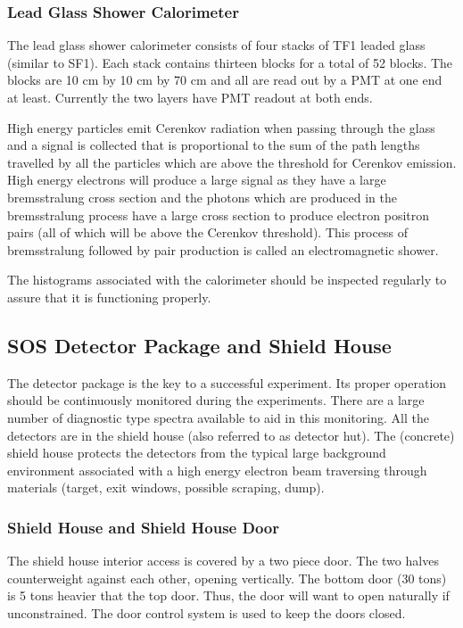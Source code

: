 \subsubsection{Lead Glass Shower Calorimeter}

The lead glass shower calorimeter consists of four stacks of
TF1 leaded glass (similar to SF1). Each stack contains thirteen
blocks for a total of 52 blocks. The blocks are 10 cm by 10 cm by 70
cm and all are read out by a PMT at one end at least.  Currently the
two layers have PMT readout at both ends.

High energy particles
emit Cerenkov radiation when passing through the glass and a signal
is collected that is proportional to the sum of the path lengths
travelled by all the
particles which are above the threshold for Cerenkov emission. High energy
electrons will produce a large signal as they have a large bremsstralung
cross section and the photons which are produced in the bremsstralung
process have a large cross section to produce electron positron pairs
(all of which will be above the Cerenkov threshold). This process
of bremsstralung followed by pair production is called an electromagnetic
shower.

The histograms associated with the calorimeter should be inspected
regularly to assure that it is functioning properly.


\subsection{SOS Detector Package and Shield House }

The detector package is the key to a successful experiment. Its proper
operation should be continuously monitored during the experiments.
There are a large number of diagnostic type spectra available to aid in
this monitoring.
All the detectors are in the shield house (also referred to as detector hut).
The (concrete) shield house protects the detectors from the typical large
background environment associated with a high energy electron beam
traversing through materials (target, exit windows, possible scraping, dump).

\subsubsection{Shield House and Shield House Door}

The shield house interior access is covered by a two piece door. The two
halves counterweight against each other, opening vertically. The bottom
door (30 tons) is 5 tons heavier that the top door. Thus, the door will want
to open naturally if unconstrained. The door control system is used to keep
the doors closed.

